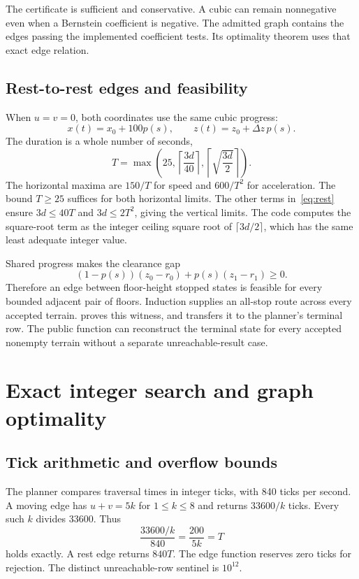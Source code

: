 \documentclass[11pt]{article}
\begin{document}
The certificate is sufficient and conservative.  A cubic can remain nonnegative even when a Bernstein coefficient is negative.  The admitted graph contains the edges passing the implemented coefficient tests.  Its optimality theorem uses that exact edge relation.

\subsection{Rest-to-rest edges and feasibility}

When $u=v=0$, both coordinates use the same cubic progress:
\[
 x(t)=x_0+100p(s),\qquad z(t)=z_0+\Delta z\,p(s).
\]
The duration is a whole number of seconds,
\begin{equation}
 T=\max\left(25,\left\lceil\frac{3d}{40}\right\rceil,
                    \left\lceil\sqrt{\frac{3d}{2}}\right\rceil\right).
 \label{eq:rest}
\end{equation}
The horizontal maxima are $150/T$ for speed and $600/T^2$ for acceleration.  The bound $T\geq25$ suffices for both horizontal limits.  The other terms in~\eqref{eq:rest} ensure $3d\leq40T$ and $3d\leq2T^2$, giving the vertical limits.  The code computes the square-root term as the integer ceiling square root of $\lceil3d/2\rceil$, which has the same least adequate integer value.

Shared progress makes the clearance gap
\[
 (1-p(s))(z_0-r_0)+p(s)(z_1-r_1)\geq0.
\]
Therefore an edge between floor-height stopped states is feasible for every bounded adjacent pair of floors.  Induction supplies an all-stop route across every accepted terrain.   proves this witness, and  transfers it to the planner's terminal row.  The public function can reconstruct the terminal state for every accepted nonempty terrain without a separate unreachable-result case.

\section{Exact integer search and graph optimality}
\label{sec:search}

\subsection{Tick arithmetic and overflow bounds}

The planner compares traversal times in integer ticks, with 840 ticks per second.  A moving edge has $u+v=5k$ for $1\leq k\leq8$ and returns $33600/k$ ticks.  Every such $k$ divides 33600.  Thus
\[
 \frac{33600/k}{840}=\frac{200}{5k}=T
\]
holds exactly.  A rest edge returns $840T$.  The edge function reserves zero ticks for rejection.  The distinct unreachable-row sentinel is $10^{12}$.
\end{document}
